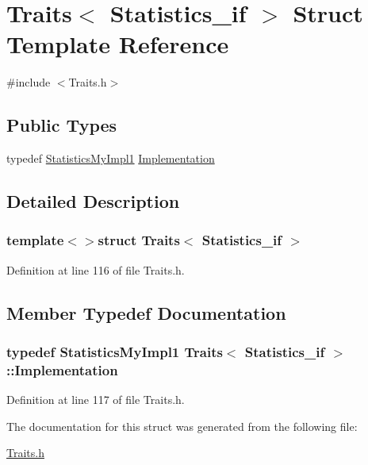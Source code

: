 \hypertarget{struct_traits_3_01_statistics__if_01_4}{\section{Traits$<$ Statistics\-\_\-if $>$ Struct Template Reference}
\label{struct_traits_3_01_statistics__if_01_4}
}


{\ttfamily \#include $<$Traits.\-h$>$}

\subsection*{Public Types}
\begin{DoxyCompactItemize}
\item 
typedef \hyperlink{class_statistics_my_impl1}{Statistics\-My\-Impl1} \hyperlink{struct_traits_3_01_statistics__if_01_4_aa783d604a6a3ee386790463a4ccc3b94}{Implementation}
\end{DoxyCompactItemize}


\subsection{Detailed Description}
\subsubsection*{template$<$$>$struct Traits$<$ Statistics\-\_\-if $>$}



Definition at line 116 of file Traits.\-h.



\subsection{Member Typedef Documentation}
\hypertarget{struct_traits_3_01_statistics__if_01_4_aa783d604a6a3ee386790463a4ccc3b94}{
\subsubsection[{Implementation}]{\setlength{\rightskip}{0pt plus 5cm}typedef {\bf Statistics\-My\-Impl1} {\bf Traits}$<$ {\bf Statistics\-\_\-if} $>$\-::{\bf Implementation}}}\label{struct_traits_3_01_statistics__if_01_4_aa783d604a6a3ee386790463a4ccc3b94}


Definition at line 117 of file Traits.\-h.



The documentation for this struct was generated from the following file\-:\begin{DoxyCompactItemize}
\item 
\hyperlink{_traits_8h}{Traits.\-h}\end{DoxyCompactItemize}
